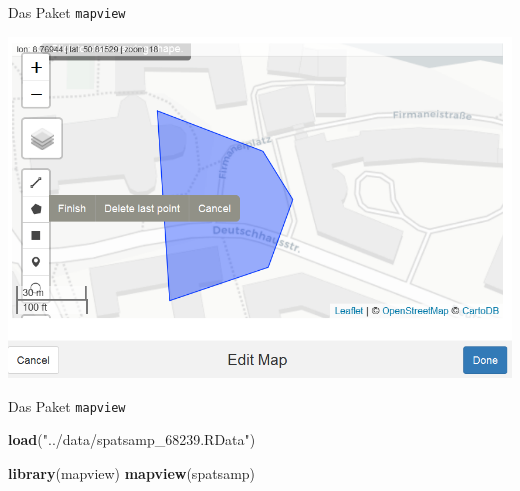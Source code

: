 \documentclass[ignorenonframetext,]{beamer}
\newenvironment{Shaded}{\begin{snugshade}}{\end{snugshade}}
\newcommand{\KeywordTok}[1]{\textcolor[rgb]{0.13,0.29,0.53}{\textbf{#1}}}
\newcommand{\StringTok}[1]{\textcolor[rgb]{0.31,0.60,0.02}{#1}}
\newcommand{\OperatorTok}[1]{\textcolor[rgb]{0.81,0.36,0.00}{\textbf{#1}}}
\newcommand{\NormalTok}[1]{#1}
\begin{document}
\begin{frame}[fragile]{Das Paket \texttt{mapview}}

\begin{Shaded}
\end{Shaded}

\includegraphics{figure/editmap.PNG}

\end{frame}

\begin{frame}[fragile]{Das Paket \texttt{mapview}}

\begin{Shaded}
\begin{Highlighting}[]
\KeywordTok{load}\NormalTok{(}\StringTok{"../data/spatsamp_68239.RData"}\NormalTok{)}
\end{Highlighting}
\end{Shaded}

\begin{Shaded}
\begin{Highlighting}[]
\KeywordTok{library}\NormalTok{(mapview)}
\KeywordTok{mapview}\NormalTok{(spatsamp)}
\end{Highlighting}
\end{Shaded}

\end{frame}
\end{document}
